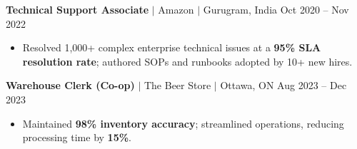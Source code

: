\documentclass[11pt,a4paper]{article}
\begin{document}
\textbf{Technical Support Associate} $|$ Amazon $|$ Gurugram, India \hfill Oct 2020 -- Nov 2022
\begin{itemize}
    \item Resolved 1,000+ complex enterprise technical issues at a \textbf{95\% SLA resolution rate}; authored SOPs and runbooks adopted by 10+ new hires.
\end{itemize}

\vspace{4pt}

\textbf{Warehouse Clerk (Co-op)} $|$ The Beer Store $|$ Ottawa, ON \hfill Aug 2023 -- Dec 2023
\begin{itemize}
    \item Maintained \textbf{98\% inventory accuracy}; streamlined operations, reducing processing time by \textbf{15\%}.
\end{itemize}
\end{document}
